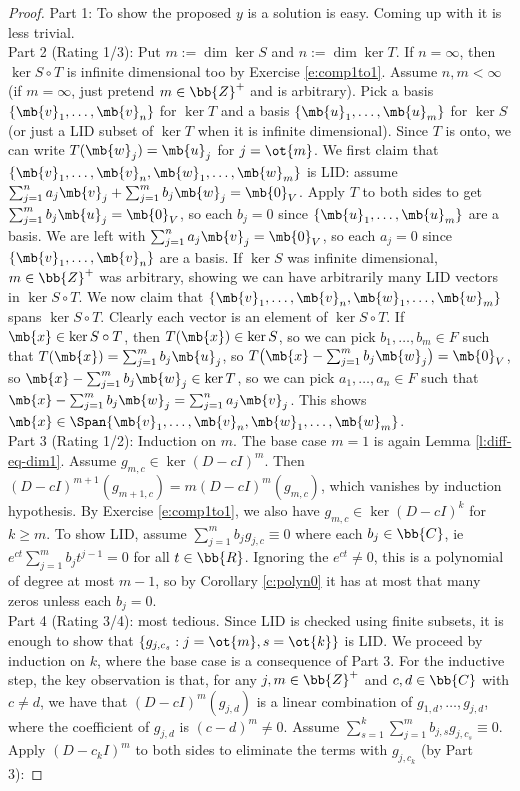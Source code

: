 \begin{proof}%
Part 1: To show the proposed $y$ is a solution is easy. Coming up with it is less trivial.\\
Part 2 (Rating 1/3): Put $m:=\dim \ker S$ and $n:= \dim \ker T$. If $n=\infty$, then $\ker S \circ T$ is infinite dimensional too by Exercise \ref{e:comp1to1}.
Assume $n,m<\infty$ (if $m=\infty$, just pretend $m \in \bb{Z}^+$ and is arbitrary). Pick a basis $\{ \mb{v}_1,\ldots,\mb{v}_n \}$ for $\ker T$ and a basis $\{ \mb{u}_1,\ldots,\mb{u}_m \}$ for $\ker S$ (or just a LID subset of $\ker T$ when it is infinite dimensional). Since $T$ is onto, we can write $T(\mb{w}_j)=\mb{u}_j$ for $j=\ot{m}$.
We first claim that $\{ \mb{v}_1,\ldots,\mb{v}_n,\mb{w}_1, \ldots,\mb{w}_m \}$ is LID: assume $\sum_{j=1}^na_j \mb{v}_j+ \sum_{j=1}^mb_j \mb{w}_j= \mb{0}_V$. Apply $T$ to both sides to get $\sum_{j=1}^mb_j \mb{u}_j= \mb{0}_V$, so each $b_j=0$ since $\{ \mb{u}_1,\ldots,\mb{u}_m \}$ are a basis. We are left with $\sum_{j=1}^na_j \mb{v}_j= \mb{0}_V$, so each $a_j=0$ since $\{ \mb{v}_1,\ldots,\mb{v}_n \}$ are a basis. If $\ker S$ was infinite dimensional, $m \in \bb{Z}^+$ was arbitrary, showing we can have arbitrarily many LID vectors in $\ker S \circ T$.
We now claim that $\{ \mb{v}_1,\ldots,\mb{v}_n,\mb{w}_1, \ldots,\mb{w}_m \}$ spans $\ker S \circ T$. Clearly each vector is an element of $\ker S \circ T$. If $\mb{x}\in \ker S \circ T$, then $T(\mb{x}) \in \ker S$, so we can pick $b_1, \ldots,b_m \in F$ such that $T(\mb{x})=\sum_{j=1}^mb_j \mb{u}_j$, so $T \big( \mb{x}- \sum_{j=1}^mb_j \mb{w}_j \big)= \mb{0}_V$, so $\mb{x}- \sum_{j=1}^mb_j \mb{w}_j \in \ker T$, so we can pick $a_1, \ldots,a_n \in F$ such that $\mb{x}- \sum_{j=1}^mb_j \mb{w}_j= \sum_{j=1}^na_j \mb{v}_j$. This shows $\mb{x}\in \Span \{ \mb{v}_1,\ldots,\mb{v}_n,\mb{w}_1, \ldots,\mb{w}_m \}$.\\
Part 3 (Rating 1/2): Induction on $m$. The base case $m=1$ is again Lemma \ref{l:diff-eq-dim1}. Assume $g_{m,c}\in \ker (D-cI)^m$. Then $(D-cI)^{m+1}(g_{m+1,c})=m(D-cI)^m(g_{m,c})$, which vanishes by induction hypothesis. By Exercise \ref{e:comp1to1}, we also have $g_{m,c}\in \ker (D-cI)^k$ for $k \geq m$.
To show LID, assume $\sum_{j=1}^mb_jg_{j,c}\equiv 0$ where each $b_j \in \bb{C}$, ie $e^{ct}\sum_{j=1}^mb_jt^{j-1}=0$ for all $t \in \bb{R}$. Ignoring the $e^{ct}\neq 0$, this is a polynomial of degree at most $m-1$, so by Corollary \ref{c:polyn0} it has at most that many zeros unless each $b_j=0$.\\
Part 4 (Rating 3/4): most tedious. Since LID is checked using finite subsets, it is enough to show that $\{ g_{j,c_s}:j=\ot{m},s=\ot{k}\}$ is LID. We proceed by induction on $k$, where the base case is a consequence of Part 3. For the inductive step, the key observation is that, for any $j,m \in \bb{Z}^+$ and $c,d \in \bb{C}$ with $c \neq d$, we have that $(D-cI)^m(g_{j,d})$ is a linear combination of $g_{1,d}, \ldots,g_{j,d}$, where the coefficient of $g_{j,d}$ is $(c-d)^m \neq 0$. Assume $\sum_{s=1}^k \sum_{j=1}^mb_{j,s}g_{j,c_s}\equiv 0$. Apply $(D-c_kI)^m$ to both sides to eliminate the terms with $g_{j,c_k}$ (by Part 3):

\end{proof}
